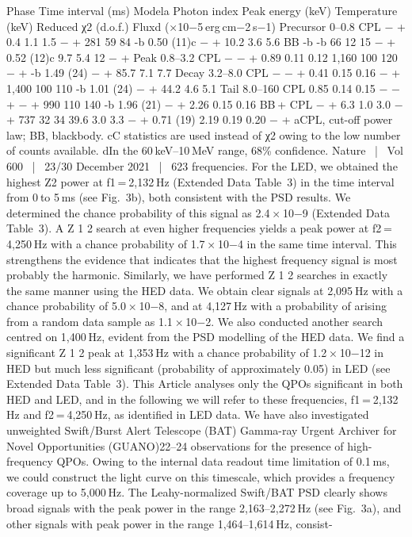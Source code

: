 Phase
Time interval (ms)
Modela
Photon index
Peak energy (keV)
Temperature (keV)
Reduced χ2 (d.o.f.)
Fluxd (×10−5 erg cm−2 s−1)
Precursor
0–0.8
CPL
−
+
0.4 1.1
1.5
−
+
281 59
84
-b
0.50 (11)c
−
+
10.2 3.6
5.6
BB
-b
-b
66 12
15
−
+
0.52 (12)c
9.7 5.4
12
−
+
Peak
0.8–3.2
CPL
−
−
+
0.89 0.11
0.12
1,160 100
120
−
+
-b
1.49 (24)
−
+
85.7 7.1
7.7
Decay
3.2–8.0
CPL
−
−
+
0.41 0.15
0.16
−
+
1,400 100
110
-b
1.01 (24)
−
+
44.2 4.6
5.1
Tail
8.0–160
CPL
0.85 0.14
0.15
−
−
+
−
+
990 110
140
-b
1.96 (21)
−
+
2.26 0.15
0.16
BB + CPL
−
+
6.3 1.0
3.0
−
+
737 32
34
39.6 3.0
3.3
−
+
0.71 (19)
2.19 0.19
0.20
−
+
aCPL, cut-off power law; BB, blackbody.
cC statistics are used instead of χ2 owing to the low number of counts available.
dIn the 60 keV–10 MeV range, 68\% confidence.
Nature  |  Vol 600  |  23/30 December 2021  |  623
frequencies. For the LED, we obtained the highest Z2 power at
f1 = 2,132 Hz (Extended Data Table 3) in the time interval from 0 to 5 ms
(see Fig. 3b), both consistent with the PSD results. We determined the
chance probability of this signal as 2.4 × 10−9 (Extended Data Table 3).
A Z 1
2 search at even higher frequencies yields a peak power at
f2 = 4,250 Hz with a chance probability of 1.7 × 10−4 in the same time
interval. This strengthens the evidence that indicates that the highest
frequency signal is most probably the harmonic. Similarly, we have
performed Z 1
2 searches in exactly the same manner using the HED data.
We obtain clear signals at 2,095 Hz with a chance probability of
5.0 × 10−8, and at 4,127 Hz with a probability of arising from a random
data sample as 1.1 × 10−2. We also conducted another search centred on
1,400 Hz, evident from the PSD modelling of the HED data. We find a
significant Z 1
2 peak at 1,353 Hz with a chance probability of 1.2 × 10−12
in HED but much less significant (probability of approximately 0.05)
in LED (see Extended Data Table 3). This Article analyses only the QPOs
significant in both HED and LED, and in the following we will refer to
these frequencies, f1 = 2,132 Hz and f2 = 4,250 Hz, as identified in
LED data.
We have also investigated unweighted Swift/Burst Alert Telescope
(BAT) Gamma-ray Urgent Archiver for Novel Opportunities (GUANO)22–24
observations for the presence of high-frequency QPOs. Owing to the
internal data readout time limitation of 0.1 ms, we could construct the
light curve on this timescale, which provides a frequency coverage up
to 5,000 Hz. The Leahy-normalized Swift/BAT PSD clearly shows broad
signals with the peak power in the range 2,163–2,272 Hz (see Fig. 3a),
and other signals with peak power in the range 1,464–1,614 Hz, consist-

